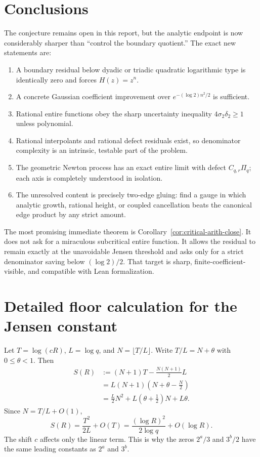 \documentclass[11pt]{article}
\theoremstyle{definition}
\begin{document}
\section{Conclusions}

The conjecture remains open in this report, but the analytic endpoint is now considerably sharper than ``control the boundary quotient.''  The exact new statements are:

\begin{enumerate}
\item A boundary residual below dyadic or triadic quadratic logarithmic type is identically zero and forces \(H(z)=z^n\).
\item A concrete Gaussian coefficient improvement over \(e^{-(\log2)n^2/2}\) is sufficient.
\item Rational entire functions obey the sharp uncertainty inequality \(4\sigma_2\delta_2\ge1\) unless polynomial.
\item Rational interpolants and rational defect residuals exist, so denominator complexity is an intrinsic, testable part of the problem.
\item The geometric Newton process has an exact entire limit with defect \(C_{q,r}\Pi_q\); each axis is completely understood in isolation.
\item The unresolved content is precisely two-edge gluing: find a gauge in which analytic growth, rational height, or coupled cancellation beats the canonical edge product by any strict amount.
\end{enumerate}

The most promising immediate theorem is Corollary~\ref{cor:critical-arith-close}.  It does not ask for a miraculous subcritical entire function.  It allows the residual to remain exactly at the unavoidable Jensen threshold and asks only for a strict denominator saving below \((\log2)/2\).  That target is sharp, finite-coefficient-visible, and compatible with Lean formalization.

\appendix

\section{Detailed floor calculation for the Jensen constant}

Let \(T=\log(cR)\), \(L=\log q\), and \(N=\lfloor T/L\rfloor\).  Write \(T/L=N+\theta\) with \(0\le\theta<1\).  Then
\begin{align*}
 S(R)
  &:=(N+1)T-\frac{N(N+1)}2L\\
  &=L(N+1)\left(N+\theta-\frac N2\right)\\
  &=\frac L2N^2+L\left(\theta+\frac12\right)N+L\theta.
\end{align*}
Since \(N=T/L+O(1)\),
\[
  S(R)=\frac{T^2}{2L}+O(T)
      =\frac{(\log R)^2}{2\log q}+O(\log R).
\]
The shift \(c\) affects only the linear term.  This is why the zeros \(2^a/3\) and \(3^b/2\) have the same leading constants as \(2^a\) and \(3^b\).
\end{document}
